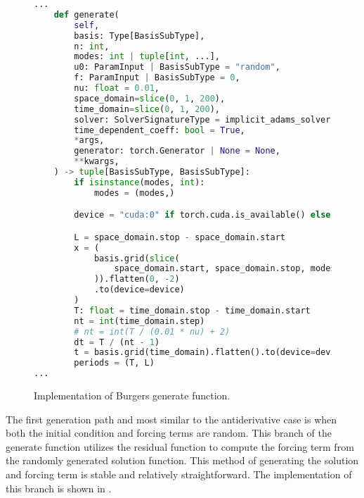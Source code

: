 \begin{figure}[H]
  \centering
  \begin{lstlisting}[language=Python]
...
    def generate(
        self,
        basis: Type[BasisSubType],
        n: int,
        modes: int | tuple[int, ...],
        u0: ParamInput | BasisSubType = "random",
        f: ParamInput | BasisSubType = 0,
        nu: float = 0.01,
        space_domain=slice(0, 1, 200),
        time_domain=slice(0, 1, 200),
        solver: SolverSignatureType = implicit_adams_solver,
        time_dependent_coeff: bool = True,
        *args,
        generator: torch.Generator | None = None,
        **kwargs,
    ) -> tuple[BasisSubType, BasisSubType]:
        if isinstance(modes, int):
            modes = (modes,)

        device = "cuda:0" if torch.cuda.is_available() else "cpu"

        L = space_domain.stop - space_domain.start
        x = (
            basis.grid(slice(
                space_domain.start, space_domain.stop, modes[0]
            )).flatten(0, -2)
            .to(device=device)
        )
        T: float = time_domain.stop - time_domain.start
        nt = int(time_domain.step)
        # nt = int(T / (0.01 * nu) + 2)
        dt = T / (nt - 1)
        t = basis.grid(time_domain).flatten().to(device=device)
        periods = (T, L)
...
  \end{lstlisting}
  \caption{Implementation of Burgers generate function.}\label{fig:burgers_generate_impl}
\end{figure}

The first generation path and most similar to the antiderivative case is when both the initial condition and forcing terms are random. This branch of the generate function utilizes the residual function to compute the forcing term from the randomly generated solution function. This method of generating the solution and forcing term is stable and relatively straightforward. The implementation of this branch is shown in .

